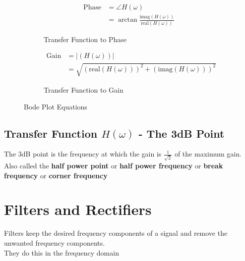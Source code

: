 \documentclass[oneside]{book}
\begin{document}
\begin{figure}[H]
\begin{subfigure}{0.22\linewidth}
                        \centering
                        \begin{align*}
                            \text{Phase} &= \angle H(\omega)\\
                            &= \arctan \frac{\text{imag} (H(\omega))}{\text{real} (H(\omega))}
                        \end{align*}
                        \caption{Transfer Function to Phase}
                    \end{subfigure}
                    \begin{subfigure}{0.22\linewidth}
                        \centering
                        \begin{align*}
                            \text{Gain} &= \left|(H(\omega))\right|\\
                            &= \sqrt{\left(\text{real} (H(\omega))\right)^2 + \left(\text{imag} (H(\omega))\right)^2}
                        \end{align*}
                        \caption{Transfer Function to Gain}
                    \end{subfigure}
                    \caption{Bode Plot Equations}
                \end{figure}
            \section{Transfer Function $H(\omega)$ - The 3dB Point}
                The 3dB point is the frequency at which the gain is $\frac{1}{\sqrt{2}}$ of the maximum gain.
                Also called the \textbf{half power point} or \textbf{half power frequency} or \textbf{break frequency} or \textbf{corner frequency}
        \chapter{Filters and Rectifiers}
            Filters keep the desired frequency components of a signal and remove the unwanted frequency components.\\
            They do this in the frequency domain
\end{document}
